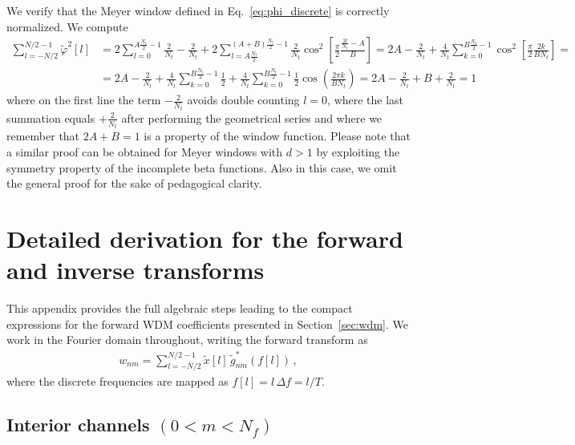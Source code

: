 \documentclass[twocolumn,preprintnumbers,
  superscriptaddress,
  nofootinbib,
  amsmath,
  amssymb,
  aps,
  prd,
  colorlinks=true,
  linkcolor=blue,
  urlcolor=blue,
  citecolor=blue,
  anchorcolor=blue
]{revtex4-2}
\begin{document}
We verify that the Meyer window defined in
Eq.~\eqref{eq:phi_discrete} is correctly normalized. We compute
%
\begin{align}
\sum_{l=-N/2}^{N/2-1} \tilde{\varphi}^2[l]&=2\sum_{l=0}^{A\frac{N_t}{2}-1}\frac{2}{N_t}-\frac{2}{N_t}+2\sum_{l=A\frac{N_t}{2}}^{(A+B)\frac{N_t}{2}-1}\frac{2}{N_t}\cos^2\left[\frac{\pi}{2}\frac{\frac{2l}{N_t}-A}{B}\right]=2A-\frac{2}{N_t}+\frac{4}{N_t}\sum_{k=0}^{B\frac{N_t}{2}-1}\cos^2\left[\frac{\pi}{2}\frac{2k}{BN_t}\right]=\nonumber\\
&=2A-\frac{2}{N_t}+\frac{4}{N_t}\sum_{k=0}^{B\frac{N_t}{2}-1}\frac{1}{2}+\frac{4}{N_t}\sum_{k=0}^{B\frac{N_t}{2}-1}\frac{1}{2}\cos\left(\frac{2\pi k}{BN_t}\right)=2A-\frac{2}{N_t}+B+\frac{2}{N_t}=1
\end{align}
%
where on the first line the term $-\frac{2}{N_t}$ avoids double counting $l=0$, where the last summation equals $+\frac{2}{N_t}$ after performing the geometrical series and where we remember that $2A+B=1$ is a property of the window function.
Please note that a similar proof can be obtained for Meyer windows with $d>1$ by exploiting the symmetry property of the incomplete beta functions. Also in this case, we omit the general proof for the sake of pedagogical clarity.

\section{Detailed derivation for the forward and inverse transforms}\label{app:forward_derivation}


 This appendix provides the full algebraic steps leading to the
compact expressions for the forward WDM coefficients presented in
Section~\ref{sec:wdm}. We work in the Fourier domain throughout,
writing the forward transform as
\begin{align}
  w_{nm}=\sum_{l=-N/2}^{N/2-1} \tilde{x}[l]\,\tilde{g}_{nm}^*(f[l])\,,
\end{align}
where the discrete frequencies are mapped as $f[l]=l\,\Delta f=l/T$.

\subsection{Interior channels \texorpdfstring{$(0<m<N_f)$}{(0<m<N_f)}}
\end{document}
